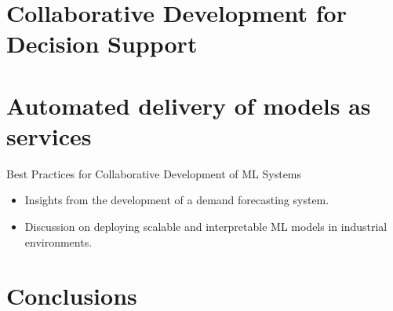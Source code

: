 

\section{Collaborative Development for Decision Support}
\label{sec:collaborative_development}





\section{Automated delivery of models as services}

Best Practices for Collaborative Development of ML Systems
\begin{itemize}
\item Insights from the development of a demand forecasting system.
\item Discussion on deploying scalable and interpretable ML models in industrial environments.
\end{itemize}


\section{Conclusions}

